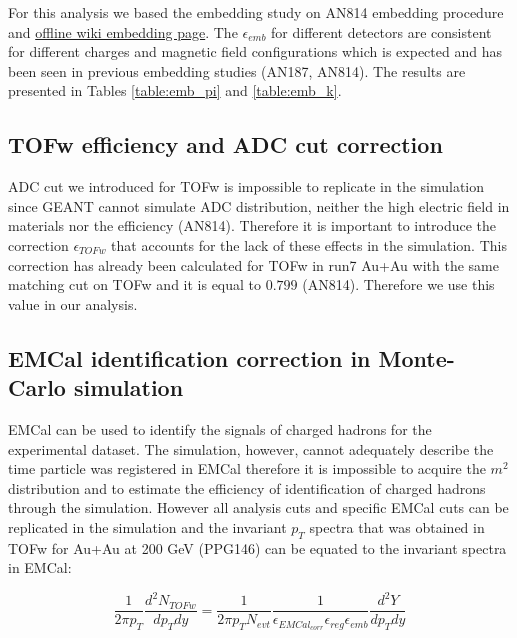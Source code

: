 For this analysis we based the embedding study on AN814 embedding procedure and \href{https://phenix-intra.sdcc.bnl.gov/phenix/WWW/offline/wikioff/index.php/EmbeddingUseCase1}{offline wiki embedding page}. The $\epsilon_{emb}$ for different detectors are consistent for different charges and magnetic field configurations which is expected and has been seen in previous embedding studies (AN187, AN814). The results are presented in Tables \ref{table:emb_pi} and \ref{table:emb_k}.

\subsection{TOFw efficiency and ADC cut correction}
\label{section:tofw_corr}

ADC cut we introduced for TOFw is impossible to replicate in the simulation since GEANT cannot simulate ADC distribution, neither the high electric field in materials nor the efficiency (AN814). Therefore it is important to introduce the correction $\epsilon_{TOFw}$ that accounts for the lack of these effects in the simulation. This correction has already been calculated for TOFw in run7 Au+Au with the same matching cut on TOFw and it is equal to $0.799$ (AN814). Therefore we use this value in our analysis.



\subsection{EMCal identification correction in Monte-Carlo simulation}

EMCal can be used to identify the signals of charged hadrons for the experimental dataset. The simulation, however, cannot adequately describe the time particle was registered in EMCal therefore it is impossible to acquire the $m^2$ distribution and to estimate the efficiency of identification of charged hadrons through the simulation. However all analysis cuts and specific EMCal cuts can be replicated in the simulation and the invariant $p_T$ spectra that was obtained in TOFw for Au+Au at 200 GeV (PPG146) can be equated to the invariant spectra in EMCal:

\begin{equation}
	\frac{1}{2\pi p_T}\frac{d^2N_{TOFw}}{dp_T dy} = \frac{1}{2 \pi p_T N_{evt}}\frac{1}{\epsilon_{EMCal_{corr}}\epsilon_{reg}\epsilon_{emb}}\frac{d^2Y}{dp_T dy}
	\label{eq:spectra_begin}
\end{equation}

